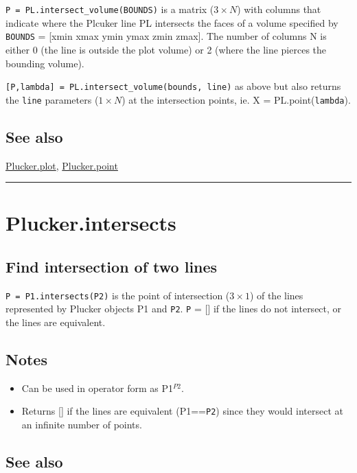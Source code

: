 \texttt{P = PL.intersect\_volume(BOUNDS)} is a matrix ($3 \times N$) with columns
that indicate where the Plcuker line PL intersects the faces of a volume
specified by \texttt{BOUNDS} = [xmin xmax ymin ymax zmin zmax].  The number of
columns N is either 0 (the line is outside the plot volume) or 2 (where
the line pierces the bounding volume).



\texttt{[P,lambda] = PL.intersect\_volume(bounds, line)} as above but also returns the
\texttt{line} parameters ($1 \times N$) at the intersection points, ie. X = PL.point(\texttt{lambda}).


\subsection*{See also}


\hyperlink{Plucker.plot}{\color{blue} Plucker.plot}, \hyperlink{Plucker.point}{\color{blue} Plucker.point}

\vspace{1.5ex}\hrule

\hypertarget{Plucker.intersects}{\section*{Plucker.intersects}}
\subsection*{Find intersection of two lines}


\texttt{P = P1.intersects(P2)} is the point of intersection ($3 \times 1$) of the lines
represented by Plucker objects P1 and \texttt{P2}.  \texttt{P} = [] if the lines
do not intersect, or the lines are equivalent.


\subsection*{Notes}
\begin{itemize}
  \item Can be used in operator form as P1${}^{P2}$.
  \item Returns [] if the lines are equivalent (P1==\texttt{P2}) since they would intersect at     an infinite number of points.
\end{itemize}

\subsection*{See also}


